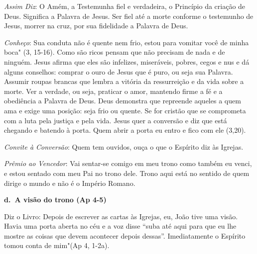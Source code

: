 \documentclass[
]{book}
\begin{document}
\emph{Assim Diz}: O Amém, a Testemunha fiel e verdadeira, o Princípio da criação de Deus. Significa a Palavra de Jesus. Ser fiel até a morte conforme o testemunho de Jesus, morrer na cruz, por sua fidelidade a Palavra de Deus.

\emph{Conheço}: Sua conduta não é quente nem frio, estou para vomitar você de minha boca" (3, 15-16). Como são ricos pensam que não precisam de nada e de ninguém. Jesus afirma que eles são infelizes, miseráveis, pobres, cegos e nus e dá alguns conselhos: comprar o ouro de Jesus que é puro, ou seja sua Palavra. Assumir roupas brancas que lembra a vitória da ressurreição e da vida sobre a morte. Ver a verdade, ou seja, praticar o amor, mantendo firme a fé e a obediência a Palavra de Deus. Deus demonstra que repreende aqueles a quem ama e exige uma posição: seja frio ou quente. Se for cristão que se comprometa com a luta pela justiça e pela vida. Jesus quer a conversão e diz que está chegando e batendo à porta. Quem abrir a porta eu entro e fico com ele (3,20).

\emph{Convite à Conversão}: Quem tem ouvidos, ouça o que o Espírito diz às Igrejas.

\emph{Prêmio ao Vencedor}: Vai sentar-se comigo em meu trono como também eu venci, e estou sentado com meu Pai no trono dele. Trono aqui está no sentido de quem dirige o mundo e não é o Império Romano.

\textbf{d.~A visão do trono (Ap 4-5)}

Diz o Livro: Depois de escrever as cartas às Igrejas, eu, João tive uma visão. Havia uma porta aberta no céu e a voz disse ``suba até aqui para que eu lhe mostre as coisas que devem acontecer depois dessas''. Imediatamente o Espírito tomou conta de mim"(Ap 4, 1-2a).
\end{document}
